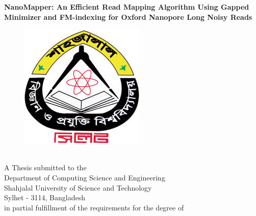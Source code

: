 \documentclass{standalone}
\begin{document}
\begin{titlepage}
\begin{center}
				\newpage
        {\Large \bf NanoMapper: An Efficient Read Mapping Algorithm Using Gapped Minimizer and FM-indexing for Oxford Nanopore Long Noisy Reads}
        \begin{figure}[h]
				\centering
				\includegraphics[scale=0.6]{./img/varsityLogo}
				\end{figure}\\
				A Thesis	
submitted to the \\
        {\large Department of Computing Science and Engineering}\\
        {\Large Shahjalal University of Science and Technology}\\
        Sylhet - 3114, Bangladesh\\

in partial fulfillment of the
requirements for the degree of \\
        

\end{center}
\end{titlepage}
\end{document}

